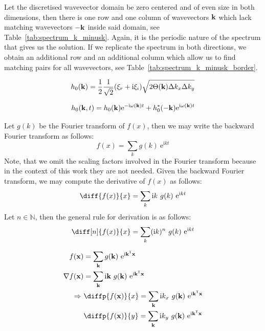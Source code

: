 %
%
Let the discretised wavevector domain be zero centered and of even size in both dimensions,
then there is one row and one column of wavevectors $\mathbf{k}$ which lack
matching wavevectors $-\mathbf{k}$ inside said domain, see Table~\ref{tab:spectrum_k_minusk}.
Again, it is the periodic nature of the spectrum that gives us the solution. If we replicate
the spectrum in both directions, we obtain an additional row and an additional column which
allow us to find matching pairs for all wavevectors, see Table~\ref{tab:spectrum_k_minusk_border}.




\begin{equation}
h_0(\mathbf{k}) =
\frac{1}{2}
\frac{1}{\sqrt{2}}(\xi_r+\mathrm{i}\xi_i)
\sqrt{2\Theta(\mathbf{k})\Delta k_x \Delta k_y}
\end{equation}

\begin{equation}
 h_0(\mathbf{k}, t) =
 h_0(\mathbf{k})\mathrm{e}^{-\mathrm{i}\omega(\mathbf{k})t}
 + h_0^\ast(\mathbf{-k})\mathrm{e}^{\mathrm{i}\omega(\mathbf{k})t}
\end{equation}

Let $g(k)$ be the Fourier transform of $f(x)$, then we may write the
backward Fourier transform as follows:
\begin{equation}
 f(x) = \sum_{k}g(k)~\mathrm{e}^{\mathrm{i}kt}
\end{equation}
Note, that we omit the scaling factors involved in the Fourier transform
because in the context of this work they are not needed.
Given the backward Fourier transform, we may compute the derivative of $f(x)$
as follows:
\begin{equation}
  \diff{f(x)}{x} = \sum_{k}\mathrm{i}k~g(k)~\mathrm{e}^{\mathrm{i}kt}
\end{equation}
Let $n \in \mathbb{N}$, then the general rule for derivation is as follows:
\begin{equation}
  \diff[n]{f(x)}{x} = \sum_{k}(\mathrm{i}k)^n~g(k)~\mathrm{e}^{\mathrm{i}kt}
\end{equation}


\begin{align}
 f(\mvec{x}) &= \sum_{\mvec{k}}g(\mvec{k})~\mathrm{e}^{\mathrm{i}\transpose{\mvec{k}}\mvec{x}} \\
 \nabla f(\mvec{x}) &= \sum_{\mvec{k}}\mathrm{i}\mvec{k}~g(\mvec{k})~\mathrm{e}^{\mathrm{i}\transpose{\mvec{k}}\mvec{x}} \\
 \Rightarrow~&\diffp{f(\mvec{x})}{x} = \sum_{\mvec{k}}\mathrm{i}k_{x}~g(\mvec{k})~\mathrm{e}^{\mathrm{i}\transpose{\mvec{k}}\mvec{x}} \\
 &\diffp{f(\mvec{x})}{y} = \sum_{\mvec{k}}\mathrm{i}k_{y}~g(\mvec{k})~\mathrm{e}^{\mathrm{i}\transpose{\mvec{k}}\mvec{x}}
\end{align}

